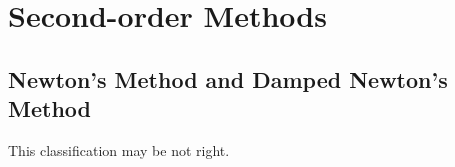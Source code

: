 \ifx\allfiles\undefined


	\else
	\fi
	\chapter{Second-order Methods}
	\section{Newton's Method and Damped Newton's Method}
		This classification may be not right.
		
		
		
	\ifx\allfiles\undefined

\fi
